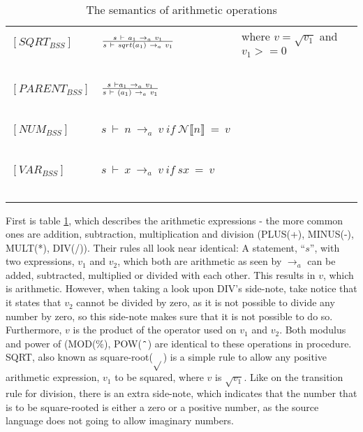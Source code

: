 \begin{table}[H]
\begin{tabular}{|l|l|l|}
	$[SQRT_{BSS}]$		& $s~\vdash~a_{1}~\rightarrow_{a}~v_{1} \over s~\vdash~sqrt(a_{1})~\rightarrow_{a}~v_{1}$												& where $v = \sqrt{v_{1}}$ and $v_1 >= 0$ \\
			~			&															~																			& ~ \\
	$[PARENT_{BSS}]$	& $s~\vdash a_{1}~\rightarrow_{a}~v_{1} \over s~\vdash~(a_{1})~\rightarrow_{a}~v_{1}$													& ~ \\
			~			&															~																			& ~ \\
	$[NUM_{BSS}]$		& $s~\vdash~n~\rightarrow_{a}~v~ if ~\mathcal{N}\llbracket n \rrbracket~=~v$															& ~ \\
			~			&															~																			& ~ \\
	$[VAR_{BSS}]$		& $s~\vdash~x~\rightarrow_{a}~v~if~sx~=~v$														   									& ~ \\
			~			&															~																			& ~ \\
	\hline
	\end{tabular}
	\label{tab:semantics_aritmethic}
	\caption{The semantics of arithmetic operations}
\end{table}

First is table \ref{tab:semantics_aritmethic}, which describes the arithmetic expressions - the more common ones are addition, subtraction, multiplication and division (PLUS(+), MINUS(-), MULT(*), DIV(/)). Their rules all look near identical: A statement, ``$s$'', with two expressions, $v_{1}$ and $v_{2}$, which both are arithmetic as seen by $\rightarrow_{a}$ can be added, subtracted, multiplied or divided with each other. This results in $v$, which is arithmetic. However, when taking a look upon DIV's side-note, take notice that it states that $v_{2}$ cannot be divided by zero, as it is not possible to divide any number by zero, so this side-note makes sure that it is not possible to do so. \\
Furthermore, $v$ is the product of the operator used on $v_{1}$ and $v_{2}$. Both modulus and power of (MOD(\%), POW($\texttt{\^{}}$) are identical to these operations in procedure. \\
SQRT, also known as square-root($\sqrt{}$) is a simple rule to allow any positive arithmetic expression, $v_{1}$ to be squared, where $v$ is $\sqrt{v_{1}}$. Like on the transition rule for division, there is an extra side-note, which indicates that the number that is to be square-rooted is either a zero or a positive number, as the source language does not going to allow imaginary numbers. \\

